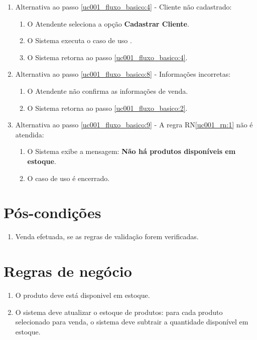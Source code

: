 \begin{enumerate}
	\item Alternativa ao passo \ref{uc001_fluxo_basico:4} - Cliente não cadastrado:
	\begin{enumerate}
		\item O Atendente seleciona a opção \textbf{Cadastrar Cliente}.
		\item O Sistema executa o caso de uso .
		\item O Sistema retorna ao passo \ref{uc001_fluxo_basico:4}.
	\end{enumerate}
	\item Alternativa ao passo \ref{uc001_fluxo_basico:8} - Informações incorretas:
	\begin{enumerate}
		\item O Atendente não confirma as informações de venda.
		\item O Sistema retorna ao passo \ref{uc001_fluxo_basico:2}.
	\end{enumerate}
	\item Alternativa ao passo \ref{uc001_fluxo_basico:9} - A regra RN\ref{uc001_rn:1} não é atendida:
	\begin{enumerate}
		\item O Sistema exibe a mensagem: \textbf{Não há produtos disponíveis em estoque}.
		\item O caso de uso é encerrado.
	\end{enumerate}
\end{enumerate}


\section{Pós-condições}

\begin{enumerate}
	\item Venda efetuada, se as regras de validação forem verificadas.
\end{enumerate}

\section{Regras de negócio}
\begin{enumerate}
	\item O produto deve está disponivel em estoque. \label{uc001_rn:1}
	\item O sistema deve atualizar o estoque de produtos: para cada produto selecionado para venda, o sistema deve subtrair a quantidade disponível em estoque. \label{uc001_rn:2}
\end{enumerate}

